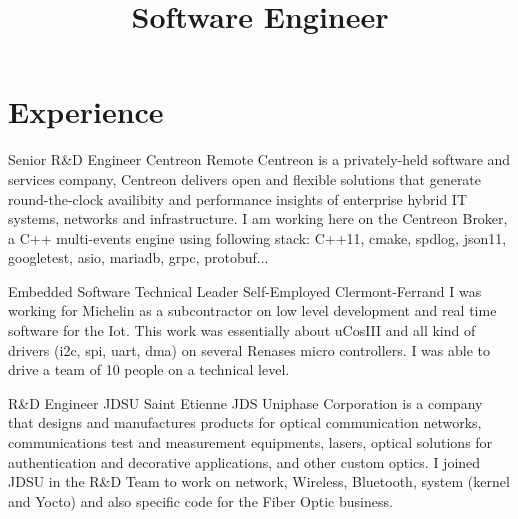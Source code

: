 \documentclass[11pt,a4paper,sans]{moderncv}
\title{Software Engineer}
\begin{document}
\makecvtitle

\section{Experience}

{Senior R\&D Engineer}
{Centreon}
{Remote}
{}
{Centreon is a privately-held software and services company, Centreon
delivers open and flexible solutions that generate round-the-clock availibity
and performance insights of enterprise hybrid IT systems, networks and infrastructure.
I am working here on the Centreon Broker, a C++ multi-events engine using following
stack: C++11, cmake, spdlog, json11, googletest, asio, mariadb, grpc, protobuf...}

{Embedded Software Technical Leader}
{Self-Employed}
{Clermont-Ferrand}
{}
{I was working for Michelin as a subcontractor on low level development
and real time software for the Iot. This work was essentially about uCosIII
and all kind of drivers (i2c, spi, uart, dma) on several Renases micro
controllers. I was able to drive a team of 10 people on a technical level.}

{R\&D Engineer}
{JDSU}
{Saint Etienne}
{}
{JDS Uniphase Corporation is a company that designs and manufactures products
for optical communication networks, communications test and measurement
equipments, lasers, optical solutions for authentication and decorative
applications, and other custom optics.
I joined JDSU in the R\&D Team to work on network, Wireless, Bluetooth,
system (kernel and Yocto) and also specific code for the Fiber Optic
business.}
\end{document}

